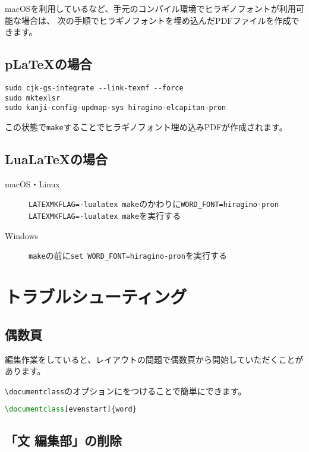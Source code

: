 macOSを利用しているなど、手元のコンパイル環境でヒラギノフォントが利用可能な場合は、
次の手順でヒラギノフォントを埋め込んだPDFファイルを作成できます。

\subsection{p\LaTeX の場合}

\begin{lstlisting}
sudo cjk-gs-integrate --link-texmf --force
sudo mktexlsr  
sudo kanji-config-updmap-sys hiragino-elcapitan-pron
\end{lstlisting}
  
この状態で\lstinline|make|することでヒラギノフォント埋め込みPDFが作成されます。

\subsection{Lua\LaTeX の場合}

\begin{description}
  \item[macOS・Linux] \lstinline|LATEXMKFLAG=-lualatex make|のかわりに\lstinline|WORD_FONT=hiragino-pron LATEXMKFLAG=-lualatex make|を実行する

  \item[Windows] \lstinline|make|の前に\lstinline|set WORD_FONT=hiragino-pron|を実行する
\end{description}

\section{トラブルシューティング}

\subsection{偶数頁}

編集作業をしていると、レイアウトの問題で偶数頁から開始していただくことがあります。

\lstinline|\documentclass|のオプションにをつけることで簡単にできます。

\begin{lstlisting}[language=TeX, mathescape]
\documentclass[evenstart]{word}
\end{lstlisting}

\subsection{「文 編集部」の削除}

